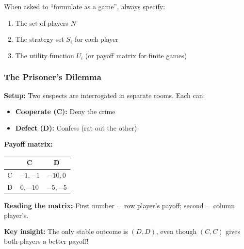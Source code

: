 \begin{tipbox}
When asked to ``formulate as a game'', always specify:
\begin{enumerate}
  \item The set of players $N$
  \item The strategy set $S_i$ for each player
  \item The utility function $U_i$ (or payoff matrix for finite games)
\end{enumerate}
\end{tipbox}

\separator

\subsubsection{The Prisoner's Dilemma}

\begin{exbox}
\textbf{Setup:} Two suspects are interrogated in separate rooms. Each can:
\begin{itemize}
  \item \textbf{Cooperate (C):} Deny the crime
  \item \textbf{Defect (D):} Confess (rat out the other)
\end{itemize}

\textbf{Payoff matrix:}
\begin{center}
\renewcommand{\arraystretch}{1.3}
\begin{tabular}{@{} c | c c @{}}
 & C & D \\
\midrule
C & $-1, -1$ & $-10, 0$ \\
D & $0, -10$ & $-5, -5$ \\
\end{tabular}
\end{center}

\textbf{Reading the matrix:} First number = row player's payoff; second = column player's.

\textbf{Key insight:} The only stable outcome is $(D, D)$, even though $(C, C)$ gives both players a better payoff!
\end{exbox}

